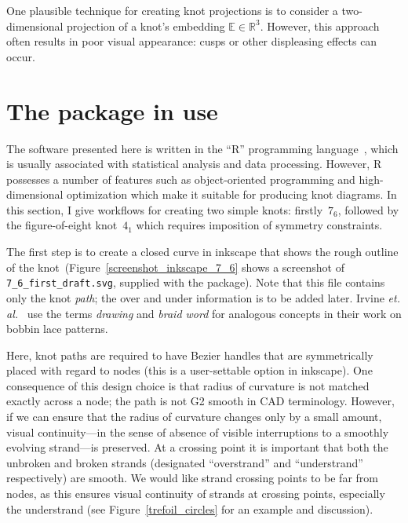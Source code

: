 \documentclass{birkjour}
\theoremstyle{definition}
\theoremstyle{remark}
\numberwithin{equation}{section}
\begin{document}
One plausible technique for creating knot projections is to consider a
two-dimensional projection of a knot's embedding
$\mathbb{E}\in\mathbb{R}^3$.  However, this approach often results in
poor visual appearance: cusps or other displeasing effects can occur.

\section{The package in use}

The software presented here is written in the ``R'' programming
language~\cite{rcore2021}, which is usually associated with
statistical analysis and data processing.  However, R possesses a
number of features such as object-oriented programming and
high-dimensional optimization which make it suitable for producing
knot diagrams.  In this section, I give workflows for creating two
simple knots: firstly~$7_6$, followed by the figure-of-eight
knot~$4_1$ which requires imposition of symmetry constraints.

The first step is to create a closed curve in inkscape that shows the
rough outline of the knot~(Figure~\ref{screenshot_inkscape_7_6} shows
a screenshot of {\tt 7\_6\_first\_draft.svg}, supplied with the
package).  Note that this file contains only the knot {\em path}; the
over and under information is to be added later.  Irvine {\em
  et. al.}~\cite{irvine2020} use the terms {\em drawing} and {\em
  braid word} for analogous concepts in their work on bobbin lace
patterns.

Here, knot paths are required to have Bezier handles that are
symmetrically placed with regard to nodes (this is a user-settable
option in inkscape).  One consequence of this design choice is that
radius of curvature is not matched exactly across a node; the path is
not G2 smooth in CAD terminology.  However, if we can ensure that the
radius of curvature changes only by a small amount, visual
continuity---in the sense of absence of visible interruptions to a
smoothly evolving strand---is preserved.  At a crossing point it is
important that both the unbroken and broken strands (designated
``overstrand'' and ``understrand'' respectively) are smooth.  We would
like strand crossing points to be far from nodes, as this ensures
visual continuity of strands at crossing points, especially the
understrand (see Figure~\ref{trefoil_circles} for an example and
discussion).
\end{document}
